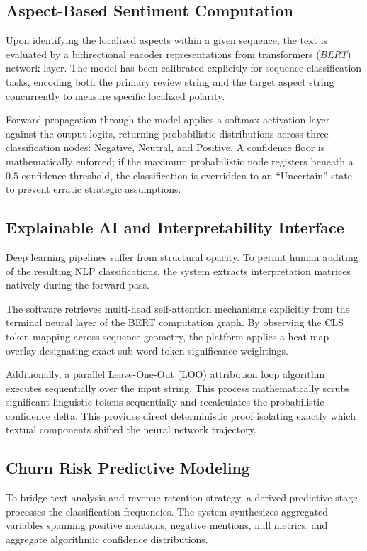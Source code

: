 \documentclass[conference]{IEEEtran}
\begin{document}
\subsection{Aspect-Based Sentiment Computation}
Upon identifying the localized aspects within a given sequence, the text is evaluated by a bidirectional encoder representations from transformers (\textit{BERT}) network layer. The model has been calibrated explicitly for sequence classification tasks, encoding both the primary review string and the target aspect string concurrently to measure specific localized polarity. 

Forward-propagation through the model applies a softmax activation layer against the output logits, returning probabilistic distributions across three classification nodes: Negative, Neutral, and Positive. A confidence floor is mathematically enforced; if the maximum probabilistic node registers beneath a $0.5$ confidence threshold, the classification is overridden to an ``Uncertain'' state to prevent erratic strategic assumptions.

\subsection{Explainable AI and Interpretability Interface}
Deep learning pipelines suffer from structural opacity. To permit human auditing of the resulting NLP classifications, the system extracts interpretation matrices natively during the forward pass. 

The software retrieves multi-head self-attention mechanisms explicitly from the terminal neural layer of the BERT computation graph. By observing the CLS token mapping across sequence geometry, the platform applies a heat-map overlay designating exact sub-word token significance weightings. 

Additionally, a parallel Leave-One-Out (LOO) attribution loop algorithm executes sequentially over the input string. This process mathematically scrubs significant linguistic tokens sequentially and recalculates the probabilistic confidence delta. This provides direct deterministic proof isolating exactly which textual components shifted the neural network trajectory.

\subsection{Churn Risk Predictive Modeling}
To bridge text analysis and revenue retention strategy, a derived predictive stage processes the classification frequencies. The system synthesizes aggregated variables spanning positive mentions, negative mentions, null metrics, and aggregate algorithmic confidence distributions.
\end{document}
